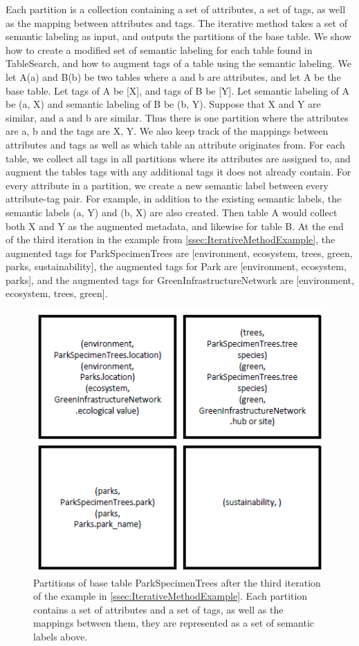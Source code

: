Each partition is a collection containing a set of attributes, a set of tags, as well as the mapping between attributes and tags. The iterative method takes a set of semantic labeling as input, and outputs the partitions of the base table. We show how to create a modified set of semantic labeling for each table found in TableSearch, and how to augment tags of a table using the semantic labeling. We let A(a) and B(b) be two tables where a and b are attributes, and let A be the base table. Let tags of A be [X], and tags of B be [Y]. Let semantic labeling of A be {(a, X)} and semantic labeling of B be {(b, Y)}. Suppose that X and Y are similar, and a and b are similar. Thus there is one partition where the attributes are {a, b} and the tags are {X, Y}. We also keep track of the mappings between attributes and tags as well as which table an attribute originates from. For each table, we collect all tags in all partitions where its attributes are assigned to, and augment the tables tags with any additional tags it does not already contain. For every attribute in a partition, we create a new semantic label between every attribute-tag pair. For example, in addition to the existing semantic labels, the semantic labels (a, Y) and (b, X) are also created. Then table A would collect both X and Y as the augmented metadata, and likewise for table B.
At the end of the third iteration in the example from \autoref{ssec:IterativeMethodExample}, the augmented tags for ParkSpecimenTrees are [environment, ecosystem, trees, green, parks, sustainability], the augmented tags for Park are [environment, ecosystem, parks], and the augmented tags for GreenInfrastructureNetwork are [environment, ecosystem, trees, green].

\begin{figure}
    \centering
    \includegraphics[width=5in]{figures/partitions-park-specimen-trees.png}
    \caption{Partitions of base table ParkSpecimenTrees after the third iteration of the example in \autoref{ssec:IterativeMethodExample}. Each partition contains a set of attributes and a set of tags, as well as the mappings between them, they are represented as a set of semantic labels above.}
    \label{fig:partitions-park-specimen-trees}
\end{figure}

